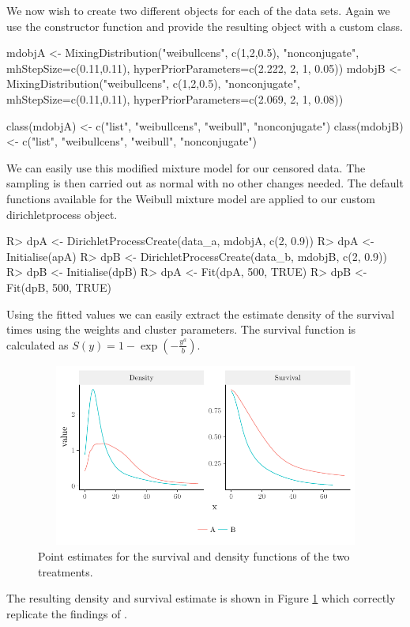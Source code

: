 \documentclass[nojss]{jss}
\begin{document}
We now wish to create two different  objects for each of the data sets. Again we use the  constructor function and provide the resulting object with a custom class.

\begin{CodeInput}
mdobjA <- MixingDistribution("weibullcens", c(1,2,0.5), "nonconjugate",
mhStepSize=c(0.11,0.11), hyperPriorParameters=c(2.222, 2, 1, 0.05))
mdobjB <- MixingDistribution("weibullcens", c(1,2,0.5), "nonconjugate",
mhStepSize=c(0.11,0.11), hyperPriorParameters=c(2.069, 2, 1, 0.08))

class(mdobjA) <- c("list", "weibullcens", "weibull", "nonconjugate")
class(mdobjB) <- c("list", "weibullcens", "weibull", "nonconjugate")
\end{CodeInput}

We can easily use this modified mixture model for our censored data. The sampling is then carried out as normal with no other changes needed. The default functions available for the Weibull mixture model are applied to our custom dirichletprocess object.
\begin{Schunk}
\begin{Sinput}
R> dpA <- DirichletProcessCreate(data_a, mdobjA, c(2, 0.9))
R> dpA <- Initialise(apA)
R> dpB <- DirichletProcessCreate(data_b, mdobjB, c(2, 0.9))
R> dpB <- Initialise(dpB)
R> dpA <- Fit(dpA, 500, TRUE)
R> dpB <- Fit(dpB, 500, TRUE)
\end{Sinput}
\end{Schunk}

Using the fitted values we can easily extract the estimate density of the survival times using the weights and cluster parameters. The survival function is calculated as $S(y) = 1 - \exp(- \frac{y ^a}{b})$.
\begin{figure}
\centering
\includegraphics[height=60mm, width=120mm]{img/weibull_censor_graph.pdf}
\caption{Point estimates for the survival and density functions of the two treatments.}
\label{fig:weibull_cens}
\end{figure}
The resulting density and survival estimate is shown in Figure \ref{fig:weibull_cens} which correctly replicate the findings of \cite{kottas_nonparametric_2006}.
\end{document}
